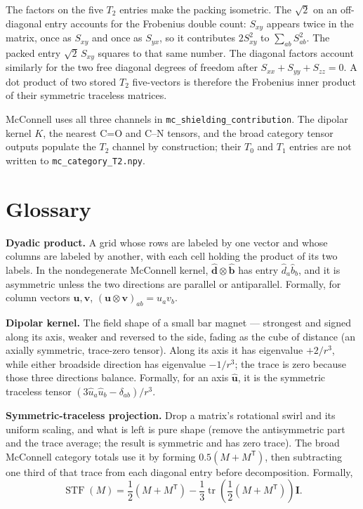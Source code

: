 \documentclass[11pt]{article}
\newcommand{\code}[1]{\texttt{#1}}
\begin{document}
The factors on the five \(T_2\) entries make the packing isometric. The
\(\sqrt2\) on an off-diagonal entry accounts for the Frobenius double count:
\(S_{xy}\) appears twice in the matrix, once as \(S_{xy}\) and once as
\(S_{yx}\), so it contributes \(2S_{xy}^2\) to
\(\sum_{ab}S_{ab}^2\). The packed entry \(\sqrt2\,S_{xy}\) squares to that
same number. The diagonal factors account similarly for the two free diagonal
degrees of freedom after \(S_{xx}+S_{yy}+S_{zz}=0\). A dot product of two stored
\(T_2\) five-vectors is therefore the Frobenius inner product of their
symmetric traceless matrices.

McConnell uses all three channels in \code{mc\_shielding\_contribution}. The
dipolar kernel \(K\), the nearest C=O and C--N tensors, and the broad category
tensor outputs populate the \(T_2\) channel by construction; their \(T_0\) and
\(T_1\) entries are not written to \code{mc\_category\_T2.npy}.

\section{Glossary}

\textbf{Dyadic product.} A grid whose rows are labeled by one vector and whose
columns are labeled by another, with each cell holding the product of its two
labels. In the nondegenerate McConnell kernel,
\(\hat{\bm d}\otimes\hat{\bm b}\) has entry \(\hat d_a\hat b_b\), and it is
asymmetric unless the two directions are parallel or antiparallel. Formally,
for column vectors \(\bm u,\bm v\),
\((\bm u\otimes\bm v)_{ab}=u_a v_b\).

\textbf{Dipolar kernel.} The field shape of a small bar magnet --- strongest
and signed along its axis, weaker and reversed to the side, fading as the cube
of distance (an axially symmetric, trace-zero tensor). Along its axis it has
eigenvalue \(+2/r^3\), while either broadside direction has
eigenvalue \(-1/r^3\); the trace is zero because those three directions
balance. Formally, for an axis \(\hat{\bm u}\), it is the symmetric traceless
tensor \((3\hat u_a\hat u_b-\delta_{ab})/r^3\).

\textbf{Symmetric-traceless projection.} Drop a matrix's rotational swirl and
its uniform scaling, and what is left is pure shape (remove the antisymmetric
part and the trace average; the result is symmetric and has zero trace). The
broad McConnell category totals use it by forming \(0.5(M+M^{\mathsf T})\), then
subtracting one third of that trace from each diagonal entry before
decomposition. Formally,
\[
  \operatorname{STF}(M)=\frac12(M+M^{\mathsf T})
  -\frac13\operatorname{tr}\!\left(\frac12(M+M^{\mathsf T})\right)\bm I .
\]
\end{document}
